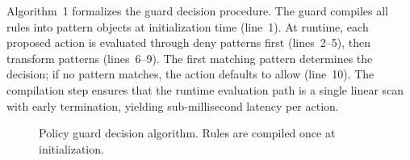 \documentclass[journal]{IEEEtran}
\begin{document}
Algorithm~1 formalizes the guard decision procedure. The guard compiles all rules into pattern objects at initialization time (line~1). At runtime, each proposed action is evaluated through deny patterns first (lines~2--5), then transform patterns (lines~6--9). The first matching pattern determines the decision; if no pattern matches, the action defaults to allow (line~10). The compilation step ensures that the runtime evaluation path is a single linear scan with early termination, yielding sub-millisecond latency per action.

\begin{figure}[t]
\centering
{}
\caption{Policy guard decision algorithm. Rules are compiled once at initialization.}
\label{fig:algorithm}
\end{figure}
\end{document}
